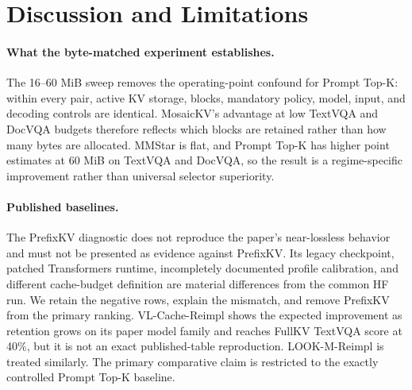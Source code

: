 



\section{Discussion and Limitations}
\label{sec:discussion}

\paragraph{What the byte-matched experiment establishes.}
The 16--60 MiB sweep removes the operating-point confound for Prompt Top-K:
within every pair, active KV storage, blocks, mandatory policy, model, input,
and decoding controls are identical.  MosaicKV's advantage at low TextVQA and
DocVQA budgets therefore reflects which blocks are retained rather than how
many bytes are allocated.  MMStar is flat, and Prompt Top-K has higher point
estimates at 60 MiB on TextVQA and DocVQA, so the result is a regime-specific
improvement rather than universal selector superiority.

\paragraph{Published baselines.}
The PrefixKV diagnostic does not reproduce the paper's near-lossless behavior
and must not be presented as evidence against PrefixKV.  Its legacy
checkpoint, patched Transformers runtime, incompletely documented profile
calibration, and different cache-budget definition are material differences
from the common HF run.  We retain the negative rows, explain the mismatch,
and remove PrefixKV from the primary ranking.  VL-Cache-Reimpl shows the
expected improvement as retention grows on its paper model family and reaches
FullKV TextVQA score at 40\%, but it is not an exact published-table
reproduction.  LOOK-M-Reimpl is treated similarly.  The primary comparative
claim is restricted to the exactly controlled Prompt Top-K baseline.

